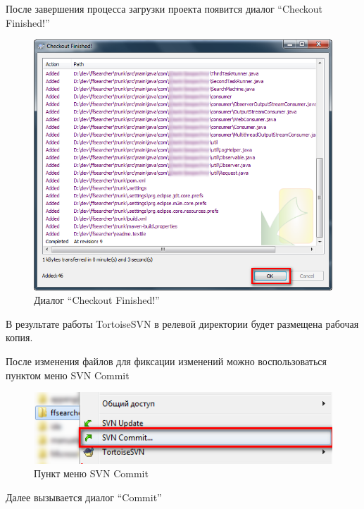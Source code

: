 \documentclass[a4paper,12pt]{article}
\begin{document}
После завершения процесса загрузки проекта появится диалог ``Checkout
Finished!''

\begin{figure}[h!]
	\centering
	\includegraphics[scale=0.75]{tortoisesvn-work-instractions-step-3.png}
	\vspace{-10pt}
	\caption{Диалог ``Checkout Finished!''}
\end{figure}

В результате работы TortoiseSVN в релевой директории будет размещена
рабочая копия.

После изменения файлов для фиксации изменений можно воспользоваться
пунктом меню SVN Commit
\begin{figure}[h!]
	\centering
	\includegraphics[scale=0.80]{tortoisesvn-work-instractions-step-4.png}
	\vspace{-10pt}
	\caption{Пункт меню SVN Commit}
\end{figure}
	
Далее вызывается диалог ``Commit''
\end{document}
